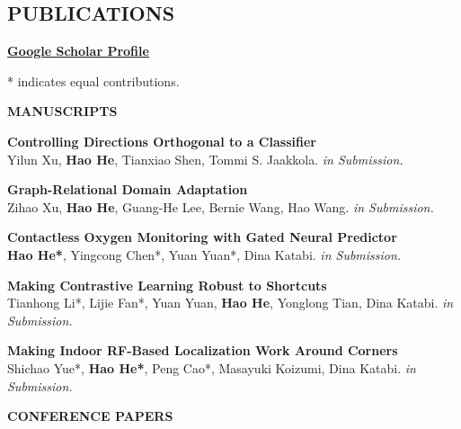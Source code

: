 \documentclass[margin]{res}
\newcommand{\Bullet}[1]{{\raisebox{0.25ex}{\tiny$\bullet$\ }}{#1}\\}
\begin{document}
\begin{resume}

\section{PUBLICATIONS}
\href{https://scholar.google.com/citations?user=v1sUoqwAAAAJ&hl=en&oi=ao}{\textbf{Google Scholar Profile}}

\small{* indicates equal contributions.}

\textbf{MANUSCRIPTS}

\textbf{Controlling Directions Orthogonal to a Classifier}\\
Yilun Xu, \textbf{Hao He}, Tianxiao Shen, Tommi S. Jaakkola. \emph{in Submission.}

\textbf{Graph-Relational Domain Adaptation}\\
Zihao Xu, \textbf{Hao He}, Guang-He Lee, Bernie Wang, Hao Wang. \emph{in Submission.}

\textbf{Contactless Oxygen Monitoring with Gated Neural Predictor}\\
\textbf{Hao He*}, Yingcong Chen*, Yuan Yuan*, Dina Katabi. \emph{in Submission.}

\small{\textbf{Making Contrastive Learning Robust to Shortcuts}}\\
Tianhong Li*, Lijie Fan*, Yuan Yuan, \textbf{Hao He}, Yonglong Tian, Dina Katabi. \emph{in Submission.}

\textbf{Making Indoor RF-Based Localization Work Around Corners}\\
Shichao Yue*, \textbf{Hao He*}, Peng Cao*, Masayuki Koizumi, Dina Katabi. \emph{in Submission.}

\textbf{CONFERENCE PAPERS}


\end{resume}
\end{document}
